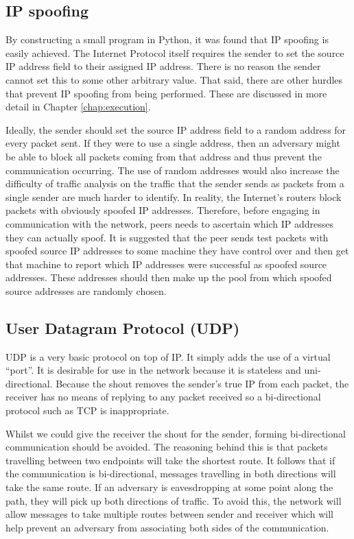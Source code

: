 \documentclass[ %
                    author={Luke Murray},
                supervisor={Dr. Simon Hollis},
                     title={Shadow Peer-to-Peer Networks},
                  subtitle={},
                    degree={MEng},
                      year={2013} ]{thesis}
\begin{document}
\subsection{IP spoofing}

By constructing a small program in Python, it was found that IP spoofing is easily achieved. The Internet Protocol itself requires the sender to set the source IP address field to their assigned IP address. There is no reason the sender cannot set this to some other arbitrary value. That said, there are other hurdles that prevent IP spoofing from being performed. These are discussed in more detail in Chapter \ref{chap:execution}.

Ideally, the sender should set the source IP address field to a random address for every packet sent. If they were to use a single address, then an adversary might be able to block all packets coming from that address and thus prevent the communication occurring. The use of random addresses would also increase the difficulty of traffic analysis on the traffic that the sender sends as packets from a single sender are much harder to identify. In reality, the Internet's routers block packets with obviously spoofed IP addresses. Therefore, before engaging in communication with the network, peers needs to ascertain which IP addresses they can actually spoof. It is suggested that the peer sends test packets with spoofed source IP addresses to some machine they have control over and then get that machine to report which IP addresses were successful as spoofed source addresses. These addresses should then make up the pool from which spoofed source addresses are randomly chosen.

\subsection{User Datagram Protocol (UDP)}

UDP is a very basic protocol on top of IP. It simply adds the use of a virtual ``port''. It is desirable for use in the network because it is stateless and uni-directional. Because the shout removes the sender's true IP from each packet, the receiver has no means of replying to any packet received so a bi-directional protocol such as TCP is inappropriate.

Whilst we could give the receiver the shout for the sender, forming bi-directional communication should be avoided. The reasoning behind this is that packets travelling between two endpoints will take the shortest route. It follows that if the communication is bi-directional, messages travelling in both directions will take the same route. If an adversary is eavesdropping at some point along the path, they will pick up both directions of traffic. To avoid this, the network will allow messages to take multiple routes between sender and receiver which will help prevent an adversary from associating both sides of the communication.
\end{document}

